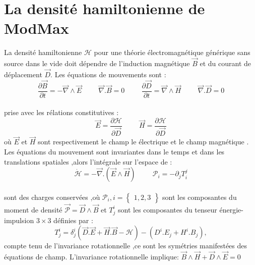 \documentclass[12pt,a4paper, openany]{report}
\begin{document}
	\section{La densité hamiltonienne de ModMax}
	La densité hamiltonienne $\mathcal{H}$ pour une théorie électromagnétique générique sans source dans le vide doit dépendre de l'induction magnétique $\vec{B}$ et du courant de déplacement $\vec{D}$. Les équations de mouvements sont :
	\begin{equation}
		\frac{\partial{\vec{B}}}{\partial t}=-\vec{\nabla}\wedge\vec{E} \hspace{1cm} \vec{\nabla}.\vec{B}=0 \hspace{1cm}
		\frac{\partial{\vec{D}}}{\partial t}=\vec{\nabla}\wedge\vec{H}  \hspace{1cm} \vec{\nabla}.\vec{D}=0 
	\end{equation}\\
	prise avec les rélations constitutives :
	\begin{equation}
		\vec{E}=\frac{\partial{\mathcal{H}}}{\partial{\vec{D}}} \hspace{1cm}  \vec{H}=\frac{\partial{\mathcal{H}}}{\partial{\vec{D}}} 
	\end{equation}
	où $\vec{E}$ et $\vec{H}$ sont respectivement le champ le électrique et le champ magnétique .
	Les équations  du mouvement sont invariantes dans le temps et dans les translations spatiales ,alors l'intégrale sur l'espace de :
	\begin{equation}
		\dot{\mathcal{H}}=-\vec{\nabla}.(\vec{E} \wedge\vec{H}) \hspace{1cm} \mathcal{P}_i=-\partial_jT_i^j  
	\end{equation}\\
	sont des charges conservées ,où $\mathcal{P}_i ,i=\left\{\begin{aligned}
		1,2,3
	\end{aligned}\right\}$ sont les composantes du moment de densité $\vec{\mathcal{P}}=\vec{D}\wedge\vec{B}$ et $ T^i_j $ sont les composantes du tenseur énergie- impulsion $3\times3$ définies par :\\
	\begin{equation}
		T_j^i=\delta^i_j(\vec{D}.\vec{E}+\vec{H}.\vec{B}-\mathcal{H})-({D}^i.{E}_j+{H}^i.{B}_j), 
	\end{equation} 
	compte tenu de l'invariance rotationnelle ,ce sont les symétries manifestées des équations de champ. L'invariance rotationnelle implique: $\vec{B}\wedge\vec{H} +\vec{D}\wedge\vec{E}=0 $ \\
\end{document}
